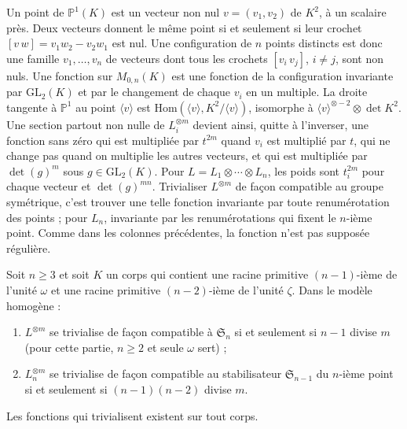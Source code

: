 Un point de $\mathbb P^1(K)$ est un vecteur non nul $v = (v_1, v_2)$ de $K^2$, à un scalaire près. Deux vecteurs donnent le même point si et seulement si leur crochet $[v\,w] = v_1 w_2 - v_2 w_1$ est nul. Une configuration de $n$ points distincts est donc une famille $v_1, \ldots, v_n$ de vecteurs dont tous les crochets $[v_i\,v_j]$, $i \neq j$, sont non nuls. Une fonction sur $M_{0,n}(K)$ est une fonction de la configuration invariante par $\mathrm{GL}_2(K)$ et par le changement de chaque $v_i$ en un multiple. La droite tangente à $\mathbb P^1$ au point $\langle v\rangle$ est $\mathrm{Hom}(\langle v\rangle, K^2/\langle v\rangle)$, isomorphe à $\langle v\rangle^{\otimes -2} \otimes \det K^2$. Une section partout non nulle de $L_i^{\otimes m}$ devient ainsi, quitte à l'inverser, une fonction sans zéro qui est multipliée par $t^{2m}$ quand $v_i$ est multiplié par $t$, qui ne change pas quand on multiplie les autres vecteurs, et qui est multipliée par $\det(g)^m$ sous $g \in \mathrm{GL}_2(K)$. Pour $L = L_1 \otimes \cdots \otimes L_n$, les poids sont $t_i^{2m}$ pour chaque vecteur et $\det(g)^{mn}$. Trivialiser $L^{\otimes m}$ de façon compatible au groupe symétrique, c'est trouver une telle fonction invariante par toute renumérotation des points ; pour $L_n$, invariante par les renumérotations qui fixent le $n$-ième point. Comme dans les colonnes précédentes, la fonction n'est pas supposée régulière.

\begin{encadre}
\begin{theoreme}\label{thm:146-general}
Soit $n \geq 3$ et soit $K$ un corps qui contient une racine primitive $(n - 1)$-ième de l'unité $\omega$ et une racine primitive $(n - 2)$-ième de l'unité $\zeta$. Dans le modèle homogène :
\begin{enumerate}
\item $L^{\otimes m}$ se trivialise de façon compatible à $\mathfrak S_n$ si et seulement si $n - 1$ divise $m$ (pour cette partie, $n \geq 2$ et seule $\omega$ sert) ;
\item $L_n^{\otimes m}$ se trivialise de façon compatible au stabilisateur $\mathfrak S_{n-1}$ du $n$-ième point si et seulement si $(n - 1)(n - 2)$ divise $m$.
\end{enumerate}
Les fonctions qui trivialisent existent sur tout corps.
\end{theoreme}
\end{encadre}

